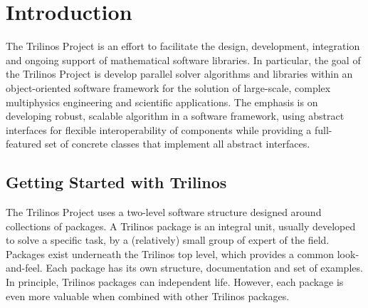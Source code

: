 % 
% 
% 
%   
%   
% 
% 

\chapter{Introduction}

The Trilinos Project is an effort to facilitate the design, development,
integration and ongoing support of mathematical software libraries. In
particular, the goal of the Trilinos Project is develop parallel solver
algorithms and libraries within an object-oriented software framework
for the solution of large-scale, complex multiphysics engineering and
scientific applications. The emphasis is on developing robust, scalable
algorithm in a software framework, using abstract interfaces for
flexible interoperability of components while providing a full-featured
set of concrete classes that implement all abstract interfaces.


\section{Getting Started with Trilinos}
\label{sec:getting}

The Trilinos Project uses a two-level software structure designed around
collections of packages. A Trilinos package is an integral unit, usually
developed to solve a specific task, by a (relatively) small group of
expert of the field.  Packages exist underneath the Trilinos top level,
which provides a common look-and-feel. Each package has its own
structure, documentation and set of examples. In principle, Trilinos
packages can independent life. However, each package is even more
valuable when combined with other Trilinos packages.

